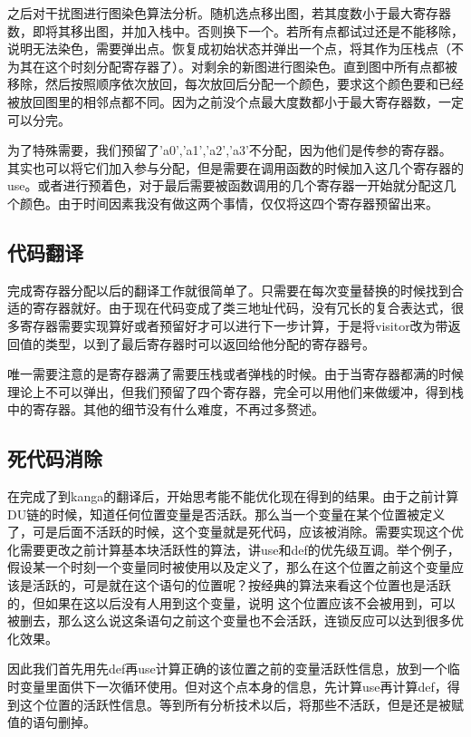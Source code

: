 \documentclass[10pt,a4paper]{article}
\begin{document}
之后对干扰图进行图染色算法分析。随机选点移出图，若其度数小于最大寄存器数，即将其移出图，并加入栈中。否则换下一个。若所有点都试过还是不能移除，说明无法染色，需要弹出点。恢复成初始状态并弹出一个点，将其作为压栈点（不为其在这个时刻分配寄存器了）。对剩余的新图进行图染色。直到图中所有点都被移除，然后按照顺序依次放回，每次放回后分配一个颜色，要求这个颜色要和已经被放回图里的相邻点都不同。因为之前没个点最大度数都小于最大寄存器数，一定可以分完。

为了特殊需要，我们预留了'a0','a1','a2','a3'不分配，因为他们是传参的寄存器。其实也可以将它们加入参与分配，但是需要在调用函数的时候加入这几个寄存器的use。或者进行预着色，对于最后需要被函数调用的几个寄存器一开始就分配这几个颜色。由于时间因素我没有做这两个事情，仅仅将这四个寄存器预留出来。


\subsection{代码翻译}

完成寄存器分配以后的翻译工作就很简单了。只需要在每次变量替换的时候找到合适的寄存器就好。由于现在代码变成了类三地址代码，没有冗长的复合表达式，很多寄存器需要实现算好或者预留好才可以进行下一步计算，于是将visitor改为带返回值的类型，以到了最后寄存器时可以返回给他分配的寄存器号。

唯一需要注意的是寄存器满了需要压栈或者弹栈的时候。由于当寄存器都满的时候理论上不可以弹出，但我们预留了四个寄存器，完全可以用他们来做缓冲，得到栈中的寄存器。其他的细节没有什么难度，不再过多赘述。

\subsection{死代码消除}
在完成了到kanga的翻译后，开始思考能不能优化现在得到的结果。由于之前计算DU链的时候，知道任何位置变量是否活跃。那么当一个变量在某个位置被定义了，可是后面不活跃的时候，这个变量就是死代码，应该被消除。需要实现这个优化需要更改之前计算基本块活跃性的算法，讲use和def的优先级互调。举个例子，假设某一个时刻一个变量同时被使用以及定义了，那么在这个位置之前这个变量应该是活跃的，可是就在这个语句的位置呢？按经典的算法来看这个位置也是活跃的，但如果在这以后没有人用到这个变量，说明
这个位置应该不会被用到，可以被删去，那么这么说这条语句之前这个变量也不会活跃，连锁反应可以达到很多优化效果。

因此我们首先用先def再use计算正确的该位置之前的变量活跃性信息，放到一个临时变量里面供下一次循环使用。但对这个点本身的信息，先计算use再计算def，得到这个位置的活跃性信息。等到所有分析技术以后，将那些不活跃，但是还是被赋值的语句删掉。
\end{document}
